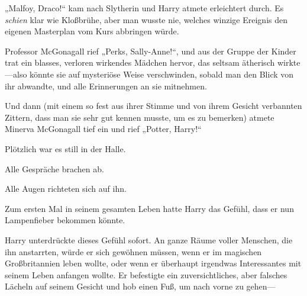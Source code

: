 „Malfoy, Draco!“ kam nach Slytherin und Harry atmete erleichtert durch. Es \emph{schien} klar wie Kloßbrühe, aber man wusste nie, welches winzige Ereignis den eigenen Masterplan vom Kurs abbringen würde.

Professor McGonagall rief „Perks, Sally-Anne!“, und aus der Gruppe der Kinder trat ein blasses, verloren wirkendes Mädchen hervor, das seltsam ätherisch wirkte—also könnte sie auf mysteriöse Weise verschwinden, sobald man den Blick von ihr abwandte, und alle Erinnerungen an sie mitnehmen.

Und dann (mit einem so fest aus ihrer Stimme und von ihrem Gesicht verbannten Zittern, dass man sie sehr gut kennen musste, um es zu bemerken) atmete Minerva McGonagall tief ein und rief „Potter, Harry!“

Plötzlich war es still in der Halle.

Alle Gespräche brachen ab.

Alle Augen richteten sich auf ihn.

Zum ersten Mal in seinem gesamten Leben hatte Harry das Gefühl, dass er nun Lampenfieber bekommen könnte.


Harry unterdrückte dieses Gefühl sofort. An ganze Räume voller Menschen, die ihn anstarrten, würde er sich gewöhnen müssen, wenn er im magischen Großbritannien leben wollte, oder wenn er überhaupt irgendwas Interessantes mit seinem Leben anfangen wollte. Er befestigte ein zuversichtliches, aber falsches Lächeln auf seinem Gesicht und hob einen Fuß, um nach vorne zu gehen—

